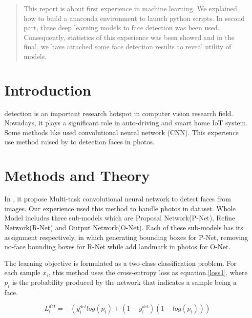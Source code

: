 \documentclass[journal, a4paper]{IEEEtran}
\begin{document}
\begin{abstract}
This report is about first experience in machine learning. We explained how to build a anaconda environment to launch python scripts. In second part, three deep learning models to face detection was been used. Consequently, statistics of this experience was been showed and in the final, we have attached some face detection results to reveal utility of models.
\end{abstract}

\section{Introduction}
 detection is an important research hotspot in computer vision research field. Nowadays, it plays a significant role in auto-driving and smart home IoT system. Some methods like \cite{ZHAN201619} used convolutional neural network (CNN). This experience use method raised by \cite{8080244} to detection faces in photos.

\section{Methods and Theory}
In \cite{8080244}, it propose Multi-task convolutional neural network to detect faces from images. Our experience used this method to handle photos in dataset. Whole Model includes three sub-models which are Proposal Network(P-Net), Refine Network(R-Net) and Output Network(O-Net). Each of these sub-models has its assignment respectively, in which generating bounding boxes for P-Net, removing no-face bounding boxes for R-Net while add landmark in photos for O-Net.

The learning objective is formulated as a two-class classification problem. For each sample $x_{i}$, this method uses the cross-entropy loss as equation.\ref{loss1}, where $p_{i}$ is the probability produced by the network that indicates a sample being a face.



\begin{equation}
    L_{i}^{det}=-(y_{i}^{det}log(p_{i})+(1-y_{i}^{det})(1-log(p_{i})) )\label{loss1}
\end{equation}
\end{document}
